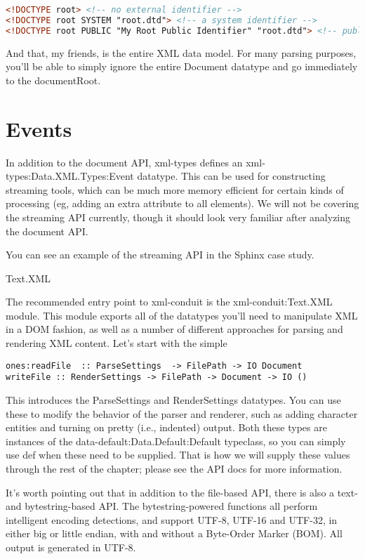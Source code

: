 \begin{lstlisting}[language=HTML]
<!DOCTYPE root> <!-- no external identifier -->
<!DOCTYPE root SYSTEM "root.dtd"> <!-- a system identifier -->
<!DOCTYPE root PUBLIC "My Root Public Identifier" "root.dtd"> <!-- public identifiers have a system ID as well -->
\end{lstlisting}

And that, my friends, is the entire XML data model. For many parsing purposes, you'll
be able to simply ignore the entire Document datatype and go immediately to the
documentRoot.

\section{Events}

In addition to the document API, xml-types defines an xml-types:Data.XML.Types:Event datatype. This can be used for constructing
streaming tools, which can be much more memory efficient for certain kinds of processing (eg,
adding an extra attribute to all elements). We will not be covering the streaming API currently,
though it should look very familiar after analyzing the document API.

You can see an example of the streaming API in the Sphinx case
study.

Text.XML

The recommended entry point to xml-conduit is the xml-conduit:Text.XML module. This module exports all of the datatypes you'll need to
manipulate XML in a DOM fashion, as well as a number of different approaches for parsing and
rendering XML content. Let's start with the simple

\begin{lstlisting}
ones:readFile  :: ParseSettings  -> FilePath -> IO Document
writeFile :: RenderSettings -> FilePath -> Document -> IO ()
\end{lstlisting}

This
introduces the ParseSettings and RenderSettings datatypes. You can use these to modify the behavior of the parser and
renderer, such as adding character entities and turning on pretty (i.e., indented) output. Both
these types are instances of the data-default:Data.Default:Default
typeclass, so you can simply use def when these need to be supplied.
That is how we will supply these values through the rest of the chapter; please see the API docs
for more information.

It's worth pointing out that in addition to the file-based API, there is also a text- and
bytestring-based API. The bytestring-powered functions all perform intelligent encoding
detections, and support UTF-8, UTF-16 and UTF-32, in either big or little endian, with and
without a Byte-Order Marker (BOM). All output is generated in UTF-8.

